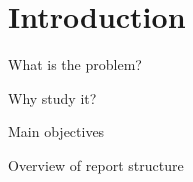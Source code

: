 \chapter{Introduction}

What is the problem?

Why study it?

Main objectives

Overview of report structure